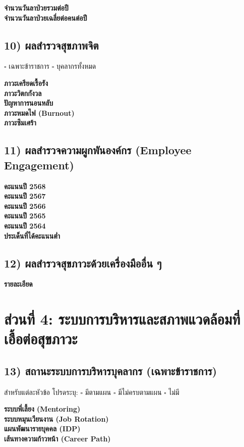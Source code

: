 \documentclass[12pt,a4paper]{article}
\newcommand{\linefield}[1]{\textbf{#1} \hrulefill}
\newcommand{\boxitem}[1]{\(\square\) #1}
\begin{document}
\linefield{จำนวนวันลาป่วยรวมต่อปี}\\
\linefield{จำนวนวันลาป่วยเฉลี่ยต่อคนต่อปี}

\subsection*{10) ผลสำรวจสุขภาพจิต}
\boxitem{เฉพาะข้าราชการ} \hspace{2em} \boxitem{บุคลากรทั้งหมด}

\linefield{ภาวะเครียดเรื้อรัง}\\
\linefield{ภาวะวิตกกังวล}\\
\linefield{ปัญหาการนอนหลับ}\\
\linefield{ภาวะหมดไฟ (Burnout)}\\
\linefield{ภาวะซึมเศร้า}

\subsection*{11) ผลสำรวจความผูกพันองค์กร (Employee Engagement)}
\linefield{คะแนนปี 2568}\\
\linefield{คะแนนปี 2567}\\
\linefield{คะแนนปี 2566}\\
\linefield{คะแนนปี 2565}\\
\linefield{คะแนนปี 2564}\\
\linefield{ประเด็นที่ได้คะแนนต่ำ}

\subsection*{12) ผลสำรวจสุขภาวะด้วยเครื่องมืออื่น ๆ}
\linefield{รายละเอียด}\\[2.2em]

\section*{ส่วนที่ 4: ระบบการบริหารและสภาพแวดล้อมที่เอื้อต่อสุขภาวะ}
\subsection*{13) สถานะระบบการบริหารบุคลากร (เฉพาะข้าราชการ)}
สำหรับแต่ละหัวข้อ โปรดระบุ: \boxitem{มีตามแผน} \boxitem{มีไม่ครบตามแผน} \boxitem{ไม่มี}

\linefield{ระบบพี่เลี้ยง (Mentoring)}\\
\linefield{ระบบหมุนเวียนงาน (Job Rotation)}\\
\linefield{แผนพัฒนารายบุคคล (IDP)}\\
\linefield{เส้นทางความก้าวหน้า (Career Path)}
\end{document}
